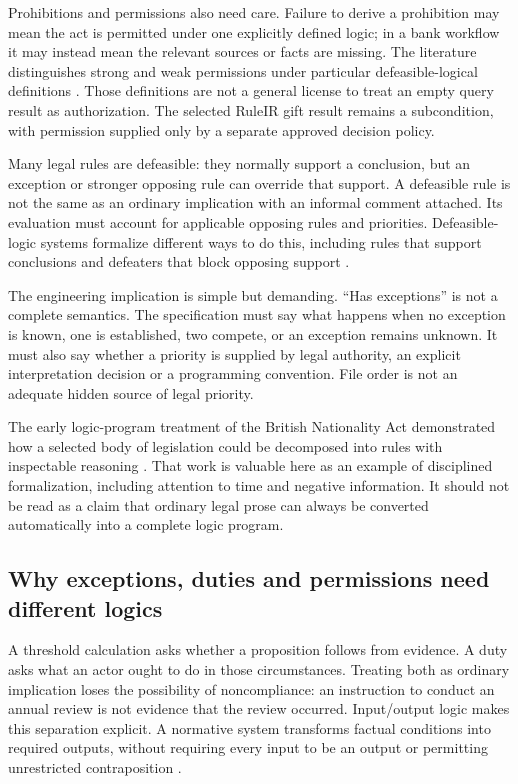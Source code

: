 \documentclass[12pt,a4paper,oneside,openany]{book}
\begin{document}
Prohibitions and permissions also need care. Failure to derive a prohibition
may mean the act is permitted under one explicitly defined logic; in a bank
workflow it may instead mean the relevant sources or facts are missing. The
literature distinguishes strong and weak permissions under particular
defeasible-logical definitions \citep[secs.~2--4]{permissions2012}. Those
definitions are not a general license to treat an empty query result as
authorization. The selected RuleIR gift result remains a subcondition, with
permission supplied only by a separate approved decision policy.

Many legal rules are defeasible: they normally support a conclusion, but an
exception or stronger opposing rule can override that support. A defeasible
rule is not the same as an ordinary implication with an informal comment
attached. Its evaluation must account for applicable opposing rules and
priorities. Defeasible-logic systems formalize different ways to do this,
including rules that support conclusions and defeaters that block opposing
support \citep[sec.~2]{defeasible2000}.

The engineering implication is simple but demanding. ``Has exceptions'' is
not a complete semantics. The specification must say what happens when no
exception is known, one is established, two compete, or an exception remains
unknown. It must also say whether a priority is supplied by legal authority,
an explicit interpretation decision or a programming convention. File order
is not an adequate hidden source of legal priority.

The early logic-program treatment of the British Nationality Act demonstrated
how a selected body of legislation could be decomposed into rules with
inspectable reasoning \citep{sergot1986}. That work is valuable here as an
example of disciplined formalization, including attention to time and negative
information. It should not be read as a claim that ordinary legal prose can
always be converted automatically into a complete logic program.

\subsection{Why exceptions, duties and permissions need different logics}
\label{merge:P-02a-foundations:00}


A threshold calculation asks whether a proposition follows from evidence. A duty
asks what an actor ought to do in those circumstances. Treating both as ordinary
implication loses the possibility of noncompliance: an instruction to conduct an
annual review is not evidence that the review occurred. Input/output logic makes
this separation explicit. A normative system transforms factual conditions into
required outputs, without requiring every input to be an output or permitting
unrestricted contraposition \citep[secs.~2--3]{inputoutput2000}.
\end{document}
